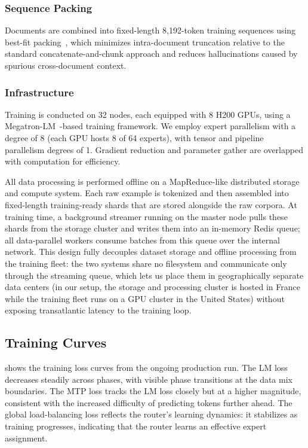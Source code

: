 \documentclass[11pt,a4paper]{article}
\begin{document}
\subsubsection{Sequence Packing}

Documents are combined into fixed-length 8{,}192-token training sequences
using best-fit packing~\cite{ding2024bestfit}, which minimizes
intra-document truncation relative to the standard concatenate-and-chunk
approach and reduces hallucinations caused by spurious cross-document
context.

\subsubsection{Infrastructure}

Training is conducted on 32 nodes, each equipped with 8 H200 GPUs, using a
Megatron-LM~\cite{shoeybi2020megatronlm}-based training framework. We employ
expert parallelism with a degree of 8 (each GPU hosts 8 of 64 experts), with
tensor and pipeline parallelism degrees of 1. Gradient
reduction and parameter gather are overlapped with computation for efficiency.

All data processing is performed offline on a MapReduce-like distributed
storage and compute system. Each raw example is tokenized and then assembled
into fixed-length training-ready shards that are stored alongside the raw
corpora. At training time, a background streamer running on the master node
pulls these shards from the storage cluster and writes them into an in-memory
Redis queue; all data-parallel workers consume batches from this queue over
the internal network. This design fully decouples dataset storage and offline
processing from the training fleet: the two systems share no filesystem and
communicate only through the streaming queue, which lets us place them in
geographically separate data centers (in our setup, the storage and
processing cluster is hosted in France while the training fleet runs on a
GPU cluster in the United States) without exposing transatlantic latency to
the training loop.

\subsection{Training Curves}
\label{sec:training-curves}

 shows the training loss curves from the ongoing
production run. The LM loss decreases steadily across phases, with visible
phase transitions at the data mix boundaries. The MTP loss tracks the LM loss
closely but at a higher magnitude, consistent with the increased difficulty of
predicting tokens further ahead. The global load-balancing loss reflects the
router's learning dynamics: it stabilizes as training progresses, indicating
that the router learns an effective expert assignment.
\end{document}
